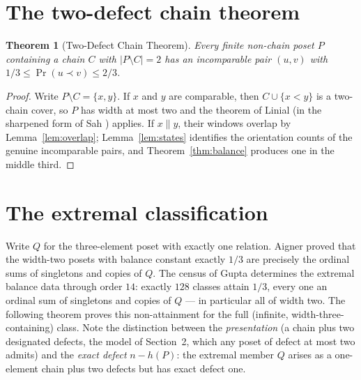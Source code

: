 \documentclass[11pt]{article}
\newtheorem{theorem}{Theorem}[section]
\theoremstyle{definition}
\theoremstyle{remark}
\newcommand{\pr}{\operatorname{Pr}}
\begin{document}
\section{The two-defect chain theorem}
\begin{theorem}[Two-Defect Chain Theorem]\label{thm:twodefect}
Every finite non-chain poset $P$ containing a chain $C$ with $|P\setminus C|=2$ has an
incomparable pair $(u,v)$ with $1/3\le\pr(u\prec v)\le 2/3$.
\end{theorem}

\begin{proof}
Write $P\setminus C=\{x,y\}$. If $x$ and $y$ are comparable, then $C\cup\{x<y\}$ is a
two-chain cover, so $P$ has width at most two and the theorem of Linial \cite{linial}
(in the sharpened form of Sah \cite{sah}) applies. If $x\parallel y$, their windows
overlap by Lemma~\ref{lem:overlap}; Lemma~\ref{lem:states} identifies the orientation
counts of the genuine incomparable pairs, and Theorem~\ref{thm:balance} produces one in
the middle third.
\end{proof}

\section{The extremal classification}
Write $Q$ for the three-element poset with exactly one relation. Aigner \cite{aigner}
proved that the width-two posets with balance constant exactly $1/3$ are precisely the
ordinal sums of singletons and copies of $Q$. The census of Gupta \cite{gupta}
determines the extremal balance data through order $14$: exactly $128$ classes attain
$1/3$, every one an ordinal sum of singletons and copies of $Q$ --- in particular all of
width two. The following theorem proves this non-attainment for the full (infinite,
width-three-containing) class. Note the distinction between the \emph{presentation}
(a chain plus two designated defects, the model of Section~2, which any poset of defect
at most two admits) and the \emph{exact defect} $n-h(P)$: the extremal member $Q$
arises as a one-element chain plus two defects but has exact defect one.
\end{document}
